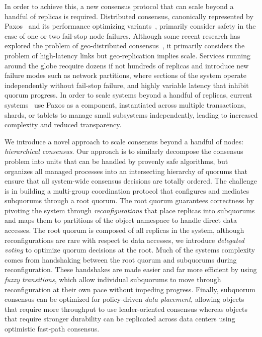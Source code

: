 \documentclass[11pt,conference]{IEEEtran}
\newcommand{\hc}{hierarchical consensus\xspace}
\newcommand{\subs}{subquorums\xspace}
\newcommand{\roo}{root quorum\xspace}
\begin{document}
In order to achieve this, a new consensus protocol that can scale beyond a handful of
replicas is required.
Distributed consensus, canonically represented by Paxos~\cite{paxos_simple} and its
performance optimizing
variants~\cite{fast_paxos,multicoordinated_paxos,spaxos,generalized_paxos}, primarily
consider safety in the case of one or two fail-stop node failures.
Although some recent research has explored the problem of geo-distributed
consensus~\cite{mencius,epaxos}, it primarily considers the problem of high-latency
links but geo-replication implies scale.
Services running around the globe recquire dozens if not hundreds of replicas and
introduce new failure modes such as network partitions, where sections of the system
operate independently without fail-stop failure, and highly variable latency that
inhibit quorum progress.
In order to scale systems beyond a handful of replicas, current
systems~\cite{spanner,scatter,mdcc,calvinfs} use Paxos as a component, instantiated
across multiple transactions, shards, or tablets to manage small subsystems
independently, leading to increased complexity and reduced transparency.

We introduce a novel approach to scale consensus beyond a handful of nodes:
\emph{\hc}.
Our approach is to similarly decompose the consensus problem into units that can be
handled by provenly safe algorithms, but organizes all managed processes into an
intersecting hierarchy of quorums that ensure that all system-wide consensus decisions
are totally ordered.
The challenge is in building a multi-group coordination protocol that configures and
mediates \subs through a \roo.
The \roo guarantees correctness by pivoting the system through \emph{reconfigurations}
that place replicas into \subs and maps them to partitions of the object namespace to
handle direct data accesses.
The \roo is composed of all replicas in the system, although reconfigurations are rare
with respect to data accesses, we introduce \emph{delegated voting} to optimize quorum
decisions at the root.
Much of the systems complexity comes from handshaking between the \roo and \subs during
reconfiguration.
These handshakes are made easier and far more efficient by using \emph{fuzzy transitions},
which allow individual \subs to move through reconfiguration at their own pace without
impeding progress.
Finally, subquorum consensus can be optimized for policy-driven \emph{data placement},
allowing objects that require more throughput to use leader-oriented consensus whereas
objects that require stronger durability can be replicated across data centers using
optimistic fast-path consensus.
\end{document}

